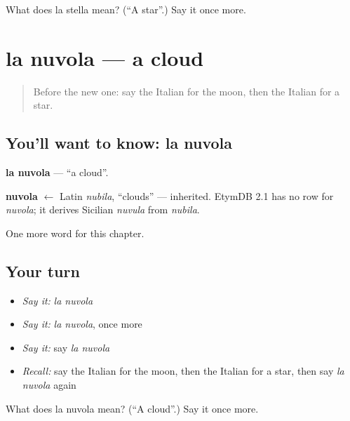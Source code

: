 \begin{tcolorbox}[breakable,colback=teal!4,colframe=teal!35!black,title={Before you move on}]
What does la stella mean? (\textquotedblleft{}A star\textquotedblright{}.) Say it once more.
\end{tcolorbox}
\section[la nuvola]{la nuvola — a cloud}

\label{lesson:IT-C67-nuvola}



\begin{quote}
Before the new one: say the Italian for the moon, then the Italian for a star.
\end{quote}

\subsection*{You'll want to know: la nuvola}
\textbf{la nuvola} — \textquotedblleft{}a cloud\textquotedblright{}.

\begin{cousinweb}
\textbf{nuvola} $\leftarrow$ Latin \emph{nubila}, \textquotedblleft{}clouds\textquotedblright{} — inherited. EtymDB 2.1 has no row for \emph{nuvola}; it derives Sicilian \emph{nuvula} from \emph{nubila}.
\end{cousinweb}

\begin{grammarlens}[title={What you've built}]
One more word for this chapter.
\end{grammarlens}

\subsection*{Your turn}
\begin{itemize}
\raggedright
  \item \emph{Say it:} \emph{la nuvola}
  \item \emph{Say it:} \emph{la nuvola}, once more
  \item \emph{Say it:} say \emph{la nuvola}
  \item \emph{Recall:} say the Italian for the moon, then the Italian for a star, then say \emph{la nuvola} again
\end{itemize}

\begin{tcolorbox}[breakable,colback=teal!4,colframe=teal!35!black,title={Before you move on}]
What does la nuvola mean? (\textquotedblleft{}A cloud\textquotedblright{}.) Say it once more.
\end{tcolorbox}

